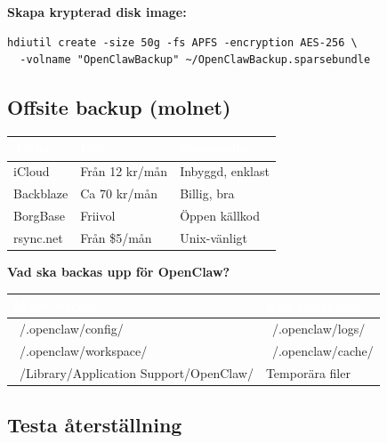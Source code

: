 \documentclass[12pt,a4paper,swedish]{article}
\begin{document}
\bigskip

\textbf{Skapa krypterad disk image:}

\begin{lstlisting}[style=latex]
hdiutil create -size 50g -fs APFS -encryption AES-256 \
  -volname "OpenClawBackup" ~/OpenClawBackup.sparsebundle
\end{lstlisting}

\subsection{Offsite backup (molnet)}
\label{sec:offsite}

\begin{center}
\begin{tabular}{|l|l|p{5cm}|}
\hline
\rowcolor{secondary}
\textcolor{white}{\textbf{Tjänst}} & \textcolor{white}{\textbf{Pris}} & \textcolor{white}{\textbf{Kommentar}} \\
\hline
iCloud & Från 12 kr/mån & Inbyggd, enklast \\
\hline
Backblaze & Ca 70 kr/mån & Billig, bra \\
\hline
BorgBase & Friivol & Öppen källkod \\
\hline
rsync.net & Från \$5/mån & Unix-vänligt \\
\hline
\end{tabular}
\end{center}

\bigskip

\textbf{Vad ska backas upp för OpenClaw?}

\begin{center}
\begin{tabular}{|p{5cm}|p{8cm}|}
\hline
\rowcolor{warning}
\textcolor{white}{\textbf{Måste backas}} & \rowcolor{success}
\textcolor{white}{\textbf{Kan återskapas}} \\
\hline
~/.openclaw/config/ & ~/.openclaw/logs/ \\
\hline
~/.openclaw/workspace/ & ~/.openclaw/cache/ \\
\hline
~/Library/Application Support/OpenClaw/ & Temporära filer \\
\hline
\end{tabular}
\end{center}

\subsection{Testa återställning}
\end{document}
